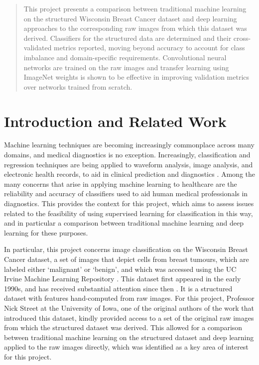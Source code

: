 \documentclass{article}
\begin{document}
	\begin{abstract}
		This project presents a comparison between traditional machine learning on the structured Wisconsin Breast Cancer dataset and deep learning approaches to the corresponding raw images from which this dataset was derived. Classifiers for the structured data are determined and their cross-validated metrics reported, moving beyond accuracy to account for class imbalance and domain-specific requirements. Convolutional neural networks are trained on the raw images and transfer learning using ImageNet weights is shown to be effective in improving validation metrics over networks trained from scratch.
	\end{abstract}

	\section{Introduction and Related Work}
	Machine learning techniques are becoming increasingly commonplace across many domains, and medical
	diagnostics is no exception. Increasingly, classification and regression techniques are being applied
	to waveform analysis, image analysis, and electronic health records, to aid in clinical prediction and diagnostics \cite{panch2018artificial}. Among the many concerns that arise in applying machine learning to healthcare are the
	reliability and accuracy of classifiers used to aid human medical professionals in diagnostics. This provides the context for this project, which aims to assess issues related to the feasibility of using supervised learning for classification in this way, and in particular a comparison between traditional machine learning and deep learning for these purposes.
	
	
	In particular, this project concerns image classification on the Wisconsin Breast Cancer dataset, a set of images that depict cells from breast tumours, which are labeled either `malignant' or `benign', and which was accessed using the UC Irvine Machine Learning Repository \cite{Dua:2019}. This dataset first appeared in the early 1990s, and has received substantial attention since then \cite{street1993nuclear}. It is a structured dataset with features hand-computed from raw images. For this project, Professor Nick Street at the University of Iowa, one of the original authors of the work that introduced this dataset, kindly provided access to a set of the original raw images from which the structured dataset was derived. This allowed for a comparison between traditional machine learning on the structured dataset and deep learning applied to the raw images directly, which was identified as a key area of interest for this project.
	
\end{document}

